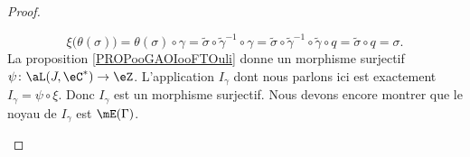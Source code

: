 \begin{proof}
\begin{subproof}
         \begin{equation}
             \xi\big( \theta(\sigma) \big)=\theta(\sigma)\circ\gamma=\tilde \sigma\circ\tilde \gamma^{-1}\circ\gamma=\tilde \sigma\circ\tilde \gamma^{-1}\circ\tilde \gamma\circ q=\tilde \sigma\circ q=\sigma.
         \end{equation}
         \spitem[Conclusion 1]
         La proposition \ref{PROPooGAOIooFTOuli} donne un morphisme surjectif \( \psi\colon \aL(J,\eC^*)\to \eZ\). L'application \( I_{\gamma}\) dont nous parlons ici est exactement \( I_{\gamma}=\psi\circ\xi\). Donc \( I_{\gamma}\) est un morphisme surjectif.
         \spitem[Noyau]
         Nous devons encore montrer que le noyau de \( I_{\gamma}\) est \( \mE(\Gamma)\). 


\end{subproof}
\end{proof}
